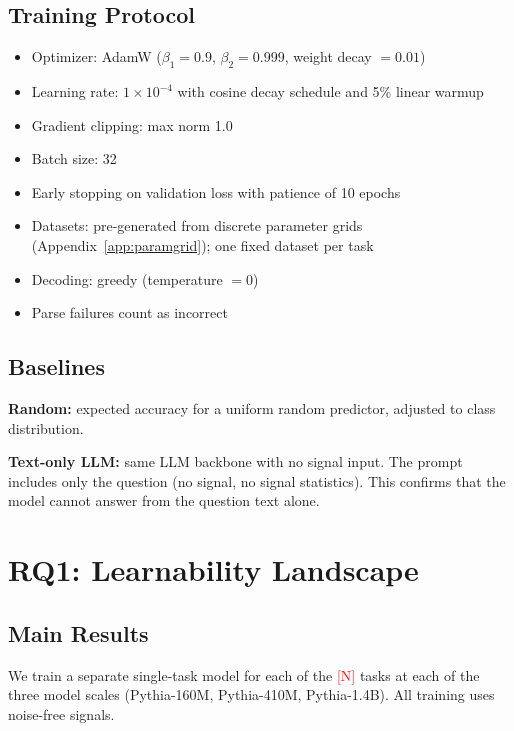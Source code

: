 \documentclass[11pt]{article}
\newcommand{\placeholder}[1]{\textcolor{red}{[#1]}}
\begin{document}
\subsection{Training Protocol}

\begin{itemize}[nosep]
    \item Optimizer: AdamW ($\beta_1 = 0.9$, $\beta_2 = 0.999$, weight decay $= 0.01$)
    \item Learning rate: $1\times10^{-4}$ with cosine decay schedule and 5\% linear warmup
    \item Gradient clipping: max norm 1.0
    \item Batch size: 32
    \item Early stopping on validation loss with patience of 10 epochs
    \item Datasets: pre-generated from discrete parameter grids (Appendix~\ref{app:paramgrid}); one fixed dataset per task
    \item Decoding: greedy (temperature $= 0$)
    \item Parse failures count as incorrect
\end{itemize}

\subsection{Baselines}

\textbf{Random:} expected accuracy for a uniform random predictor, adjusted to class distribution.

\textbf{Text-only LLM:} same LLM backbone with no signal input. The prompt includes only the question (no signal, no signal statistics). This confirms that the model cannot answer from the question text alone.


\section{RQ1: Learnability Landscape}
\label{sec:rq1}

\subsection{Main Results}

We train a separate single-task model for each of the \placeholder{N} tasks at each of the three model scales (Pythia-160M, Pythia-410M, Pythia-1.4B). All training uses noise-free signals.
\end{document}

